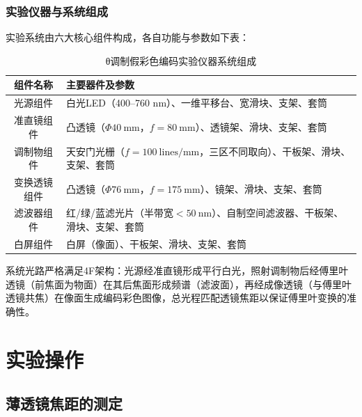 \documentclass[11pt]{article}
\begin{document}
\subsubsection{实验仪器与系统组成}
实验系统由六大核心组件构成，各自功能与参数如下表：
\begin{table}[htbp]
    \centering
    \renewcommand{\arraystretch}{1.2}
    \begin{tabular}{|c|l|}
        \hline
        	\textbf{组件名称} & \textbf{主要器件及参数} \\
        \hline
        光源组件 & 白光LED（400--760 nm）、一维平移台、宽滑块、支架、套筒 \\
        \hline
        准直镜组件 & 凸透镜（$\Phi40\ \text{mm}$，$f=80\ \text{mm}$）、透镜架、滑块、支架、套筒 \\
        \hline
        调制物组件 & 天安门光栅（$f=100\ \text{lines/mm}$，三区不同取向）、干板架、滑块、支架、套筒 \\
        \hline
        变换透镜组件 & 凸透镜（$\Phi76\ \text{mm}$，$f=175\ \text{mm}$）、镜架、滑块、支架、套筒 \\
        \hline
        滤波器组件 & 红/绿/蓝滤光片（半带宽$<50\ \text{nm}$）、自制空间滤波器、干板架、滑块、支架、套筒 \\
        \hline
        白屏组件 & 白屏（像面）、干板架、滑块、支架、套筒 \\
        \hline
    \end{tabular}
    \caption{θ调制假彩色编码实验仪器系统组成}
    \label{tab:theta_instruments}
\end{table}

系统光路严格满足4F架构：光源经准直镜形成平行白光，照射调制物后经傅里叶透镜（前焦面为物面）在其后焦面形成频谱（滤波面），再经成像透镜（与傅里叶透镜共焦）在像面生成编码彩色图像，总光程匹配透镜焦距以保证傅里叶变换的准确性。

\section{实验操作}

\subsection{薄透镜焦距的测定}
\end{document}
